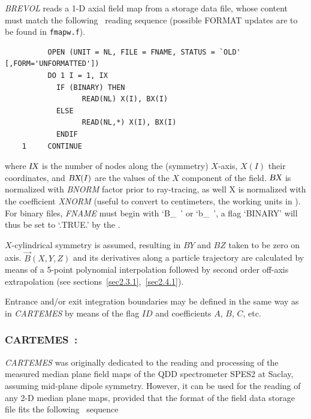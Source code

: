 {\textsl{BREVOL}  reads a 1-D axial field map from a storage data file,
whose content must match the following \FORTRAN\ reading sequence (possible FORMAT updates are to be found in \texttt{fmapw.f}).   

\bigskip


{\footnotesize
\begin{verbatim}
	      OPEN (UNIT = NL, FILE = FNAME, STATUS = `OLD' [,FORM='UNFORMATTED'])
	      DO 1 I = 1, IX
	        IF (BINARY) THEN 
	              READ(NL) X(I), BX(I)
	        ELSE
	              READ(NL,*) X(I), BX(I)
	        ENDIF
	1     CONTINUE
\end{verbatim}}
\medskip

\noindent where $\textsl{IX}$ is the number of nodes along the (symmetry) $X$-axis, $X(I)$
their coordinates, and $\textsl{BX}(I)$ are the values of the $X$ component of the field. $\textsl{BX}$ is 
normalized with \textsl{BNORM} factor prior to ray-tracing, as well  X is normalized with 
 the coefficient  \textsl{XNORM}  (useful to convert to centimeters, the working units in  \zgoubi). 
For binary files, \textsl{FNAME} must begin with \mbox{`B\_ '} or  \mbox{`b\_ '}, 
a flag `BINARY' will thus be set to `.TRUE.' by the \FORTRAN.  

\bigskip

\noindent $X$-cylindrical symmetry is assumed, resulting in $BY$ and $BZ$ taken to 
be zero on axis. $ \vec {B} {(X,Y,Z)} $ and its derivatives along a
particle trajectory are calculated by means of a 5-point polynomial interpolation followed by second 
order off-axis  extrapolation (see sections~\ref{sec2.3.1},~\ref{sec2.4.1}).  
\bigskip

\noindent Entrance and/or exit integration boundaries may be defined in the same way 
as in \textsl{CARTEMES} by means of the flag $ID$ and coefficients
$A$, $B$, $C$, etc. 

\newpage

\subsubsection*{CARTEMES~: \CARTEMESTitl}\label{CARTEMES}
\medskip

\textsl{CARTEMES}  was originally dedicated to the reading 
and processing of the measured median plane field maps of the QDD spectrometer  SPES2 at Saclay, 
assuming mid-plane dipole symmetry.  However, it can be
used for the reading of any 2-D median plane maps, provided that the format of the
field data storage file fits the following \FORTRAN\ sequence 


}
